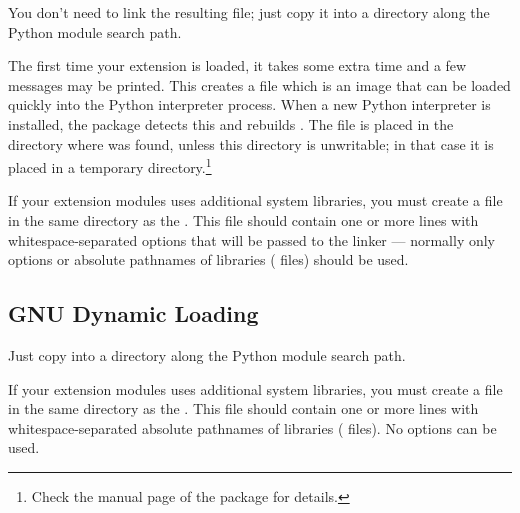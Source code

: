 \documentclass[twoside,openright]{report}
\begin{document}
You don't need to link the resulting  file; just
copy it into a directory along the Python module search path.

The first time your extension is loaded, it takes some extra time and
a few messages may be printed.  This creates a file
 which is an image that can be loaded quickly into
the Python interpreter process.  When a new Python interpreter is
installed, the  package detects this and rebuilds
.  The file  is placed in the
directory where  was found, unless this directory is
unwritable; in that case it is placed in a temporary
directory.\footnote{Check the manual page of the  package for
details.}

If your extension modules uses additional system libraries, you must
create a file  in the same directory as the
.  This file should contain one or more lines with
whitespace-separated options that will be passed to the linker ---
normally only  options or absolute pathnames of libraries
( files) should be used.


\subsection{GNU Dynamic Loading}

Just copy  into a directory along the Python module
search path.

If your extension modules uses additional system libraries, you must
create a file  in the same directory as the
.  This file should contain one or more lines with
whitespace-separated absolute pathnames of libraries (
files).  No  options can be used.


%


\end{document}
